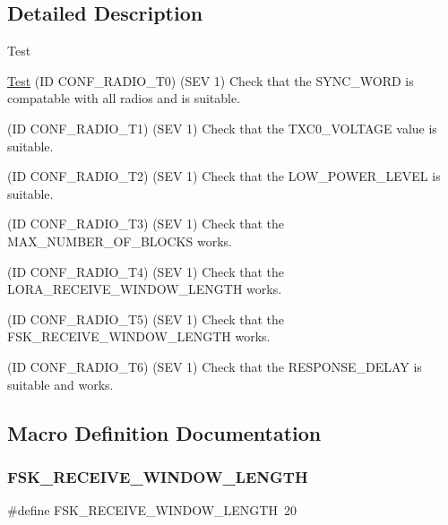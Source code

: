 \subsection{Detailed Description}
\begin{DoxyRefDesc}{Test}
\item[\hyperlink{test__test000025}{Test}](ID C\+O\+N\+F\+\_\+\+R\+A\+D\+I\+O\+\_\+\+T0) (S\+EV 1) Check that the S\+Y\+N\+C\+\_\+\+W\+O\+RD is compatable with all radios and is suitable. 

(ID C\+O\+N\+F\+\_\+\+R\+A\+D\+I\+O\+\_\+\+T1) (S\+EV 1) Check that the T\+X\+C0\+\_\+\+V\+O\+L\+T\+A\+GE value is suitable. 

(ID C\+O\+N\+F\+\_\+\+R\+A\+D\+I\+O\+\_\+\+T2) (S\+EV 1) Check that the L\+O\+W\+\_\+\+P\+O\+W\+E\+R\+\_\+\+L\+E\+V\+EL is suitable. 

(ID C\+O\+N\+F\+\_\+\+R\+A\+D\+I\+O\+\_\+\+T3) (S\+EV 1) Check that the M\+A\+X\+\_\+\+N\+U\+M\+B\+E\+R\+\_\+\+O\+F\+\_\+\+B\+L\+O\+C\+KS works. 

(ID C\+O\+N\+F\+\_\+\+R\+A\+D\+I\+O\+\_\+\+T4) (S\+EV 1) Check that the L\+O\+R\+A\+\_\+\+R\+E\+C\+E\+I\+V\+E\+\_\+\+W\+I\+N\+D\+O\+W\+\_\+\+L\+E\+N\+G\+TH works. 

(ID C\+O\+N\+F\+\_\+\+R\+A\+D\+I\+O\+\_\+\+T5) (S\+EV 1) Check that the F\+S\+K\+\_\+\+R\+E\+C\+E\+I\+V\+E\+\_\+\+W\+I\+N\+D\+O\+W\+\_\+\+L\+E\+N\+G\+TH works. 

(ID C\+O\+N\+F\+\_\+\+R\+A\+D\+I\+O\+\_\+\+T6) (S\+EV 1) Check that the R\+E\+S\+P\+O\+N\+S\+E\+\_\+\+D\+E\+L\+AY is suitable and works.\end{DoxyRefDesc}


\subsection{Macro Definition Documentation}
\mbox{\label{group__defines__radio__common__configuraiton_ga6ecfb0a7dee19b5096beeafbc7289815}} 
\subsubsection{\texorpdfstring{F\+S\+K\+\_\+\+R\+E\+C\+E\+I\+V\+E\+\_\+\+W\+I\+N\+D\+O\+W\+\_\+\+L\+E\+N\+G\+TH}{FSK\_RECEIVE\_WINDOW\_LENGTH}}
{\footnotesize\ttfamily \#define F\+S\+K\+\_\+\+R\+E\+C\+E\+I\+V\+E\+\_\+\+W\+I\+N\+D\+O\+W\+\_\+\+L\+E\+N\+G\+TH~20}

